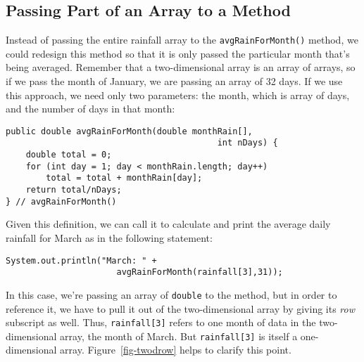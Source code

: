 \subsection{Passing Part of an Array to a Method}
\noindent Instead of passing the entire rainfall array to the
{\tt avgRainForMonth()} method, we could redesign this method so that it
is only passed the particular month that's being averaged.  Remember
that a two-dimensional array is an array of arrays, so if we pass the
month of January, we are passing an array of 32 days.  If we use this
approach, we need only two parameters: the month, which is array of
days, and the number of days in that month:

\begin{jjjlisting}
\begin{lstlisting}
public double avgRainForMonth(double monthRain[], 
                                          int nDays) {
    double total = 0;
    for (int day = 1; day < monthRain.length; day++)
        total = total + monthRain[day];
    return total/nDays;
} // avgRainForMonth()
\end{lstlisting}
\end{jjjlisting}

\noindent Given this definition, we can call it to
calculate and print the average daily rainfall for March as
in the following statement:

\begin{jjjlisting}
\begin{lstlisting}
System.out.println("March: " + 
                      avgRainForMonth(rainfall[3],31));
\end{lstlisting}
\end{jjjlisting}

\noindent In this case, we're passing an array of {\tt double}
to the method, but in order to reference it, we have to pull it out of
the two-dimensional array by giving its {\it row} subscript as well.
Thus, {\tt rainfall[3]} refers to one month of data in the
two-dimensional array, the month of March.  But
{\tt rainfall[3]} is itself a one-dimensional array.
Figure~\ref{fig-twodrow} helps to clarify this point.

\begin{figure}[h!]
\end{figure}

